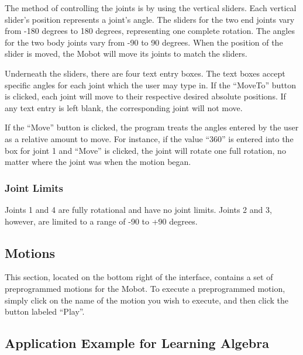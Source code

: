 \documentclass{article}
\begin{document}
The method of controlling the joints is by using the vertical sliders.
Each vertical slider's position represents a joint's angle. The sliders for the
two end joints vary from -180 degrees to 180 degrees, representing one complete
rotation. The angles for the two body joints vary from -90 to 90 degrees. When
the position of the slider is moved, the Mobot will move its joints to match the 
sliders. 

Underneath the sliders, there are four text entry boxes. The text boxes
accept specific angles for each joint which the user may type in. If 
the ``MoveTo'' button is clicked, each joint will move to their respective 
desired absolute positions. If any text entry is left blank, the corresponding joint will
not move. 

If the ``Move'' button is clicked, the program treats the angles entered by the
user as a relative amount to move. For instance, if the value ``360'' is entered
into the box for joint 1 and ``Move'' is clicked, the joint will rotate one full
rotation, no matter where the joint was when the motion began.

\subsubsection{Joint Limits}
Joints 1 and 4 are fully rotational and have no joint limits. Joints 2 and 3, however, are 
limited to a range of -90 to +90 degrees.

\subsection{Motions}
This section, located on the bottom right of the interface, contains a set of
preprogrammed motions for the Mobot. To execute a preprogrammed motion, simply
click on the name of the motion you wish to execute, and then click the button
labeled ``Play''.

\subsection{Application Example for Learning Algebra}
\end{document}
